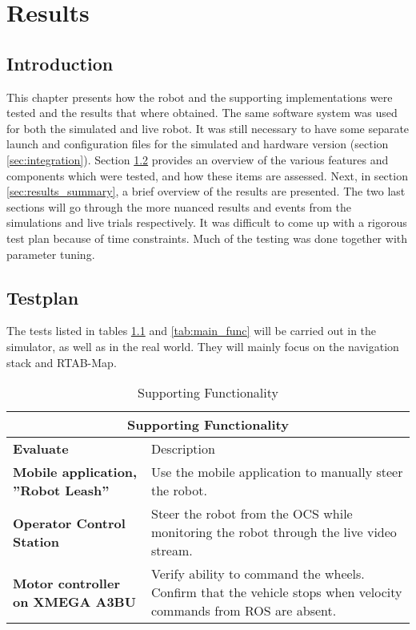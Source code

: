 \chapter{Results}
\label{chp:results} 

\section{Introduction}

This chapter presents how the robot and the supporting implementations were tested and the results that where obtained. The same software system was used for both the simulated and live robot. It was still necessary to have some separate launch and configuration files for the simulated and hardware version (section \ref{sec:integration}). Section \ref{sec:testplan} provides an overview of the various features and components which were tested, and how these items are assessed. Next, in section \ref{sec:results_summary}, a brief overview of the results are presented. The two last sections will go through the more nuanced results and events from the simulations and live trials respectively. It was difficult to come up with a rigorous test plan because of time constraints. Much of the testing was done together with parameter tuning. 


\section{Testplan}
\label{sec:testplan}
The tests listed in tables \ref{tab:support_func} and \ref{tab:main_func} will be carried out in the simulator, as well as in the real world. They will mainly focus on the navigation stack and \ac{RTAB-Map}. 

\begin{table}
	\centering
	\begin{tabular}{ p{3.5cm} | p{7cm} }
		\multicolumn{2}{c}{Supporting Functionality}\\
		\hline
		\textbf{Evaluate} & Description\\
		\hline
		\textbf{Mobile application, ''Robot Leash''} & Use the mobile application to manually steer the robot.\\
		\hline
		\textbf{Operator Control Station} & Steer the robot from the \ac{OCS} while monitoring the robot through the live video stream. \\
		\hline
		\textbf{Motor controller on XMEGA A3BU} & Verify ability to command the wheels. Confirm that the vehicle stops when velocity commands from \ac{ROS} are absent.\\
		\hline
	\end{tabular}
	\caption{Supporting Functionality}\label{tab:support_func}
\end{table}

